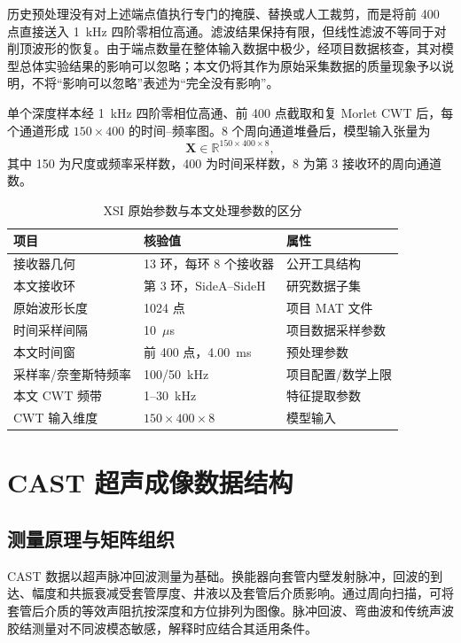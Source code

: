 历史预处理没有对上述端点值执行专门的掩膜、替换或人工裁剪，而是将前 400 点直接送入 1~kHz 四阶零相位高通。滤波结果保持有限，但线性滤波不等同于对削顶波形的恢复。由于端点数量在整体输入数据中极少，经项目数据核查，其对模型总体实验结果的影响可以忽略；本文仍将其作为原始采集数据的质量现象予以说明，不将“影响可以忽略”表述为“完全没有影响”。

单个深度样本经 1~kHz 四阶零相位高通、前 400 点截取和复 Morlet CWT 后，每个通道形成 $150\times400$ 的时间--频率图。8 个周向通道堆叠后，模型输入张量为
\begin{equation}
  \mathbf{X}\in\mathbb{R}^{150\times400\times8},
  \label{eq:xsi-input-shape}
\end{equation}
其中 150 为尺度或频率采样数，400 为时间采样数，8 为第 3 接收环的周向通道数。

\begin{table}[htbp]
  \centering
  \caption{XSI 原始参数与本文处理参数的区分}
  \label{tab:xsi-parameters}
  \begin{tabular}{p{}p{}p{}}
    \toprule
    项目 & 核验值 & 属性 \\
    \midrule
    接收器几何 & 13 环，每环 8 个接收器 & 公开工具结构 \\
    本文接收环 & 第 3 环，SideA--SideH & 研究数据子集 \\
    原始波形长度 & 1024 点 & 项目 MAT 文件 \\
    时间采样间隔 & 10~$\mu$s & 项目数据采样参数 \\
    本文时间窗 & 前 400 点，4.00~ms & 预处理参数 \\
    采样率/奈奎斯特频率 & 100/50~kHz & 项目配置/数学上限 \\
    本文 CWT 频带 & 1--30~kHz & 特征提取参数 \\
    CWT 输入维度 & $150\times400\times8$ & 模型输入 \\
    \bottomrule
  \end{tabular}
\end{table}

\section{CAST 超声成像数据结构}

\subsection{测量原理与矩阵组织}

CAST 数据以超声脉冲回波测量为基础。换能器向套管内壁发射脉冲，回波的到达、幅度和共振衰减受套管厚度、井液以及套管后介质影响。通过周向扫描，可将套管后介质的等效声阻抗按深度和方位排列为图像。脉冲回波、弯曲波和传统声波胶结测量对不同波模态敏感，解释时应结合其适用条件\cite{Froelich1982CementEvaluation,Froelich2008MultimodeCement,Wang2016AcousticCementMethods}。

